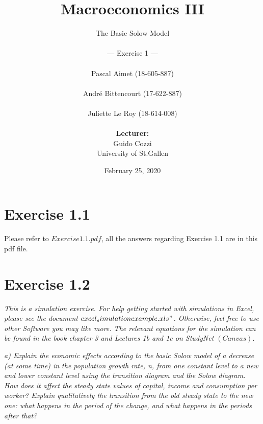 \documentclass[11pt]{article} %
\begin{document}
\title{\huge{Macroeconomics III}}

\author{The Basic Solow Model\\
    \\
    --- Exercise 1 ---\\
    \\
    Pascal Aimet (18-605-887)\\
    \\
    André Bittencourt (17-622-887)\\
    \\
    Juliette Le Roy (18-614-008)\\
    \\
    \textbf{Lecturer:}\\Guido Cozzi\\
    University of St.Gallen}
\date{February 25, 2020}
\maketitle
\thispagestyle{empty}

\pagebreak
\section{Exercise 1.1}
Please refer to $Exercise1.1.pdf$, all the answers regarding Exercise 1.1 are in this pdf file. \par
\pagebreak

\section{Exercise 1.2}
\bigskip
\textit{This is a simulation exercise. For help getting started with simulations in Excel, please see the document $excel_simulationexample.xls"$. Otherwise, feel free to use other Software you may like more. The relevant equations for the simulation can be found in the book chapter 3 and Lectures 1b and 1c on StudyNet $(Canvas).$}
\par
\noindent \textit{a) Explain the economic effects according to the basic Solow model of a decrease (at some time) in the population growth rate, n, from one constant level to a new and
lower constant level using the transition diagram and the Solow diagram. How does it affect the steady state values of capital, income and consumption per worker? Explain qualitatively the transition from the old steady state to the new one: what happens in the period of the change, and what happens in the periods after that?}\par
\end{document}
